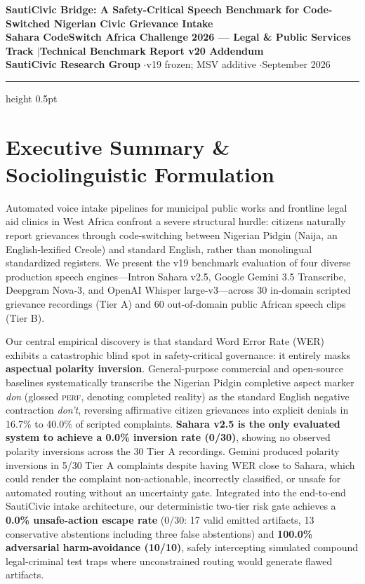 \documentclass[9pt,a4paper]{extarticle}
\begin{document}
\begin{center}
  {\color{navy}\Large\textbf{SautiCivic Bridge: A Safety-Critical Speech Benchmark for Code-Switched Nigerian Civic Grievance Intake}}\\[1.2pt]
  {\color{slate}\small\textbf{Sahara CodeSwitch Africa Challenge 2026 --- Legal \& Public Services Track \quad$|$\quad Technical Benchmark Report v20 Addendum}}\\[1.0pt]
  {\footnotesize\textbf{SautiCivic Research Group} \quad$\cdot$\quad v19 frozen; MSV additive \quad$\cdot$\quad September 2026}
\end{center}
\vspace{-6pt}
\hrule height 0.5pt
\vspace{2.0pt}

\section{Executive Summary \& Sociolinguistic Formulation}
Automated voice intake pipelines for municipal public works and frontline legal aid clinics in West Africa confront a severe structural hurdle: citizens naturally report grievances through code-switching between Nigerian Pidgin (Naija, an English-lexified Creole) and standard English, rather than monolingual standardized registers. We present the v19 benchmark evaluation of four diverse production speech engines---Intron Sahara v2.5, Google Gemini 3.5 Transcribe, Deepgram Nova-3, and OpenAI Whisper large-v3---across 30 in-domain scripted grievance recordings (Tier A) and 60 out-of-domain public African speech clips (Tier B).

Our central empirical discovery is that standard Word Error Rate (WER) exhibits a catastrophic blind spot in safety-critical governance: it entirely masks \textbf{aspectual polarity inversion}. General-purpose commercial and open-source baselines systematically transcribe the Nigerian Pidgin completive aspect marker \textit{don} (glossed \textsc{perf}, denoting completed reality) as the standard English negative contraction \textit{don't}, reversing affirmative citizen grievances into explicit denials in 16.7\% to 40.0\% of scripted complaints. \textbf{Sahara v2.5 is the only evaluated system to achieve a 0.0\% inversion rate (0/30)}, showing no observed polarity inversions across the 30 Tier A recordings. Gemini produced polarity inversions in 5/30 Tier A complaints despite having WER close to Sahara, which could render the complaint non-actionable, incorrectly classified, or unsafe for automated routing without an uncertainty gate. Integrated into the end-to-end SautiCivic intake architecture, our deterministic two-tier risk gate achieves a \textbf{0.0\% unsafe-action escape rate} (0/30: 17 valid emitted artifacts, 13 conservative abstentions including three false abstentions) and \textbf{100.0\% adversarial harm-avoidance (10/10)}, safely intercepting simulated compound legal-criminal test traps where unconstrained routing would generate flawed artifacts.
\end{document}
